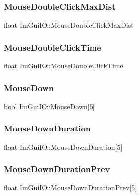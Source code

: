 \subsubsection{\texorpdfstring{Mouse\+Double\+Click\+Max\+Dist}{MouseDoubleClickMaxDist}}
{\footnotesize\ttfamily float Im\+Gui\+I\+O\+::\+Mouse\+Double\+Click\+Max\+Dist}

\hypertarget{struct_im_gui_i_o_aee056f6ed15363e0bcd8d879b312da7c}{}\label{struct_im_gui_i_o_aee056f6ed15363e0bcd8d879b312da7c} 
\subsubsection{\texorpdfstring{Mouse\+Double\+Click\+Time}{MouseDoubleClickTime}}
{\footnotesize\ttfamily float Im\+Gui\+I\+O\+::\+Mouse\+Double\+Click\+Time}

\hypertarget{struct_im_gui_i_o_a8f4613baafc93026175d9cdaf4e82d21}{}\label{struct_im_gui_i_o_a8f4613baafc93026175d9cdaf4e82d21} 
\subsubsection{\texorpdfstring{Mouse\+Down}{MouseDown}}
{\footnotesize\ttfamily bool Im\+Gui\+I\+O\+::\+Mouse\+Down\mbox{[}5\mbox{]}}

\hypertarget{struct_im_gui_i_o_ab464bf317051bbdf1c93ab36802fe3b7}{}\label{struct_im_gui_i_o_ab464bf317051bbdf1c93ab36802fe3b7} 
\subsubsection{\texorpdfstring{Mouse\+Down\+Duration}{MouseDownDuration}}
{\footnotesize\ttfamily float Im\+Gui\+I\+O\+::\+Mouse\+Down\+Duration\mbox{[}5\mbox{]}}

\hypertarget{struct_im_gui_i_o_a59d19cf7ad831e57ce15f90295871881}{}\label{struct_im_gui_i_o_a59d19cf7ad831e57ce15f90295871881} 
\subsubsection{\texorpdfstring{Mouse\+Down\+Duration\+Prev}{MouseDownDurationPrev}}
{\footnotesize\ttfamily float Im\+Gui\+I\+O\+::\+Mouse\+Down\+Duration\+Prev\mbox{[}5\mbox{]}}

